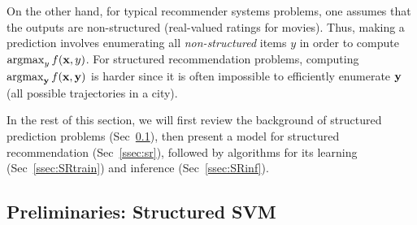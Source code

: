 On the other hand, for typical recommender systems problems, one assumes that the outputs are non-structured (\eg real-valued ratings for movies).
Thus, making a prediction involves enumerating all {\em non-structured} items $y$ in order to compute $\operatorname*{argmax}_y f(\mathbf{x},y)$.
For structured recommendation problems, computing $\operatorname*{argmax}_{\mathbf{y}} f(\mathbf{x},\mathbf{y})$ is harder since it is often impossible to efficiently enumerate $\mathbf{y}$ (\eg all possible trajectories in a city).

In the rest of this section, we will first review the background of structured prediction problems (Sec~\ref{ssec:ssvm}), then present a model for structured recommendation (Sec~\ref{ssec:sr}), followed by algorithms for its learning (Sec~\ref{ssec:SRtrain}) and inference (Sec~\ref{ssec:SRinf}).



\subsection{Preliminaries: Structured SVM}
\label{ssec:ssvm}

